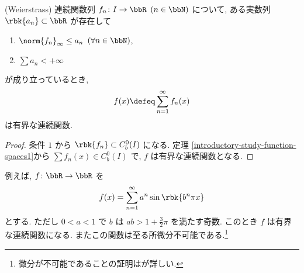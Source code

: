 \documentclass[openany, a4paper, oneside]{jsbook}
\begin{document}
\begin{thm}(Weierstrass)
 連続関数列 $f_n \colon I \to \bbR$ $(n \in \bbN)$ について,
 ある実数列 $\rbk{a_n} \subset \bbR$ が存在して
\begin{enumerate}
\item $\norm{f_n}_{\infty} \leq a_n$ $(\forall n \in \bbN)$,
\item $\sum a_n < + \infty$
\end{enumerate}
が成り立っているとき,
\begin{align*}
 f(x)
 \defeq
 \sum_{n=1}^{\infty} f_n(x)
\end{align*}
は有界な連続関数.
\end{thm}
\begin{proof}
条件 $1$ から $\rbk{f_n} \subset C^0_b(I)$ になる.
定理 \ref{introductory-study-function-spaces1}から $\sum f_n(x) \in C^0_b(I)$ で, $f$ は有界な連続関数となる.
\end{proof}
\begin{ex}
例えば, $f \colon \bbR \to \bbR$ を
\begin{align*}
 f(x)
 =
 \sum_{n=1}^{\infty} a^n \sin \rbk{b^n \pi x}
\end{align*}
とする.
ただし $0<a<1$ で $b$ は $ab > 1 + \frac{3}{2} \pi$ を満たす奇数.
このとき $f$ は有界な連続関数になる.
またこの関数は至る所微分不可能である.\footnote{微分が不可能であることの証明は\cite{WilliamDunham1}が詳しい.}
\end{ex}
\end{document}
